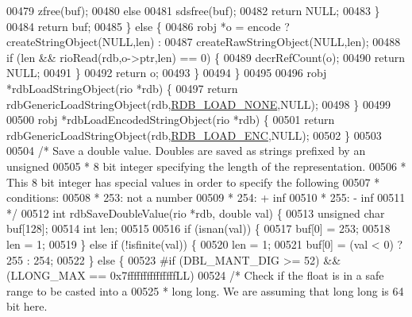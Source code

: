 \begin{DoxyCode}
{{{{{{00479                 zfree(buf);
00480             \textcolor{keywordflow}{else}
00481                 sdsfree(buf);
00482             \textcolor{keywordflow}{return} NULL;
00483         \}
00484         \textcolor{keywordflow}{return} buf;
00485     \} \textcolor{keywordflow}{else} \{
00486         robj *o = encode ? createStringObject(NULL,len) :
00487                            createRawStringObject(NULL,len);
00488         \textcolor{keywordflow}{if} (len && rioRead(rdb,o->ptr,len) == 0) \{
00489             decrRefCount(o);
00490             \textcolor{keywordflow}{return} NULL;
00491         \}
00492         \textcolor{keywordflow}{return} o;
00493     \}
00494 \}
00495 
00496 robj *rdbLoadStringObject(rio *rdb) \{
00497     \textcolor{keywordflow}{return} rdbGenericLoadStringObject(rdb,\hyperlink{rdb_8h_aa6539176570d3833856d0b6c71077c67}{RDB\_LOAD\_NONE},NULL);
00498 \}
00499 
00500 robj *rdbLoadEncodedStringObject(rio *rdb) \{
00501     \textcolor{keywordflow}{return} rdbGenericLoadStringObject(rdb,\hyperlink{rdb_8h_aea74502dc3a9f291a2ac8f3bd7d6de24}{RDB\_LOAD\_ENC},NULL);
00502 \}
00503 
00504 \textcolor{comment}{/* Save a double value. Doubles are saved as strings prefixed by an unsigned}
00505 \textcolor{comment}{ * 8 bit integer specifying the length of the representation.}
00506 \textcolor{comment}{ * This 8 bit integer has special values in order to specify the following}
00507 \textcolor{comment}{ * conditions:}
00508 \textcolor{comment}{ * 253: not a number}
00509 \textcolor{comment}{ * 254: + inf}
00510 \textcolor{comment}{ * 255: - inf}
00511 \textcolor{comment}{ */}
00512 \textcolor{keywordtype}{int} rdbSaveDoubleValue(rio *rdb, \textcolor{keywordtype}{double} val) \{
00513     \textcolor{keywordtype}{unsigned} \textcolor{keywordtype}{char} buf[128];
00514     \textcolor{keywordtype}{int} len;
00515 
00516     \textcolor{keywordflow}{if} (isnan(val)) \{
00517         buf[0] = 253;
00518         len = 1;
00519     \} \textcolor{keywordflow}{else} \textcolor{keywordflow}{if} (!isfinite(val)) \{
00520         len = 1;
00521         buf[0] = (val < 0) ? 255 : 254;
00522     \} \textcolor{keywordflow}{else} \{
00523 \textcolor{preprocessor}{#}\textcolor{preprocessor}{if} \textcolor{preprocessor}{(}\textcolor{preprocessor}{DBL\_MANT\_DIG} \textcolor{preprocessor}{>=} 52\textcolor{preprocessor}{)} \textcolor{preprocessor}{&&} \textcolor{preprocessor}{(}LLONG\_MAX \textcolor{preprocessor}{==} 0x7fffffffffffffffLL\textcolor{preprocessor}{)}
00524         \textcolor{comment}{/* Check if the float is in a safe range to be casted into a}
00525 \textcolor{comment}{         * long long. We are assuming that long long is 64 bit here.}
}}}}}}
\end{DoxyCode}

